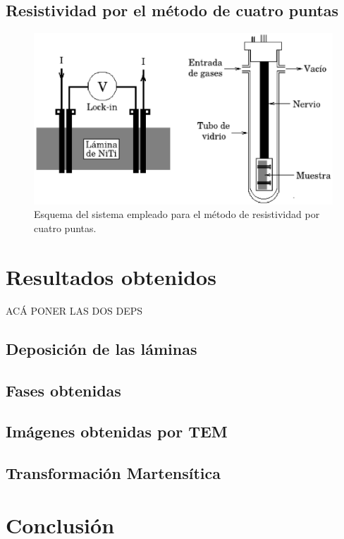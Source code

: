 \documentclass[11pt]{beamer}
\begin{document}
	\subsection{Resistividad por el método de cuatro puntas}
		\begin{frame}
			\begin{figure}[H]
				\centering
				\includegraphics[scale=0.4]{img/resistividad.eps}
				\caption{Esquema del sistema empleado para el método de 								 resistividad por cuatro puntas.}
				
			\end{figure}
		\end{frame}
	
\section{Resultados obtenidos}
	\begin{frame}
	ACÁ PONER LAS DOS DEPS
	\end{frame}
	\subsection{Deposición de las láminas}
	\subsection{Fases obtenidas}
	\subsection{Imágenes obtenidas por TEM}
	\subsection{Transformación Martensítica}
\section{Conclusión}
\end{document}
